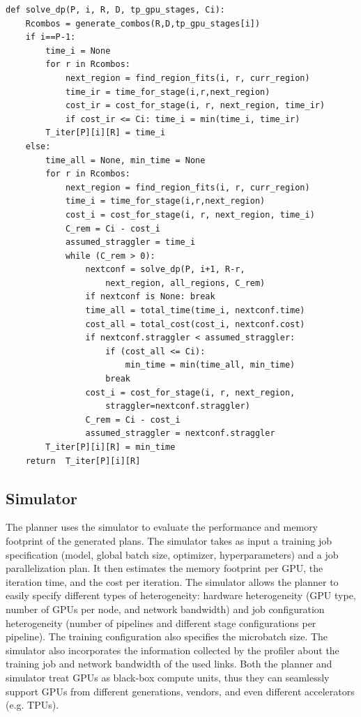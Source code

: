 \begin{lstlisting}[float, caption=Resource-Stage assignment algorithm, basicstyle=\small, label=alg:dp]
def solve_dp(P, i, R, D, tp_gpu_stages, Ci):
    Rcombos = generate_combos(R,D,tp_gpu_stages[i])
    if i==P-1:
        time_i = None
        for r in Rcombos:
            next_region = find_region_fits(i, r, curr_region)
            time_ir = time_for_stage(i,r,next_region)
            cost_ir = cost_for_stage(i, r, next_region, time_ir)
            if cost_ir <= Ci: time_i = min(time_i, time_ir)
        T_iter[P][i][R] = time_i
    else:
        time_all = None, min_time = None
        for r in Rcombos:
            next_region = find_region_fits(i, r, curr_region)
            time_i = time_for_stage(i,r,next_region)
            cost_i = cost_for_stage(i, r, next_region, time_i)
            C_rem = Ci - cost_i
            assumed_straggler = time_i
            while (C_rem > 0):
                nextconf = solve_dp(P, i+1, R-r,
                    next_region, all_regions, C_rem)
                if nextconf is None: break
                time_all = total_time(time_i, nextconf.time)
                cost_all = total_cost(cost_i, nextconf.cost)
                if nextconf.straggler < assumed_straggler:
                    if (cost_all <= Ci):
                        min_time = min(time_all, min_time)
                    break
                cost_i = cost_for_stage(i, r, next_region,
                    straggler=nextconf.straggler)
                C_rem = Ci - cost_i
                assumed_straggler = nextconf.straggler
        T_iter[P][i][R] = min_time
    return  T_iter[P][i][R]
\end{lstlisting} \label{alg:dp}

\subsection{\sailor Simulator}\label{simulator}


The planner uses the simulator to evaluate the performance and memory footprint of the generated plans. The \sailor simulator takes as input a training job specification (model, global batch size, optimizer, hyperparameters) and a job parallelization plan. It then estimates the memory footprint per GPU, the iteration time, and the cost per iteration. The simulator allows the planner to easily specify different types of heterogeneity: hardware heterogeneity (GPU type, number of GPUs per node, and network bandwidth) and job configuration heterogeneity (number of pipelines and different stage configurations per pipeline). 
The training configuration also specifies the microbatch size. 
The simulator also incorporates the information collected by the profiler about the training job and network bandwidth of the used links.  Both the \sailor planner and simulator treat GPUs as black-box compute units, thus they can seamlessly support GPUs from different generations, vendors, and even different accelerators (e.g. TPUs).

